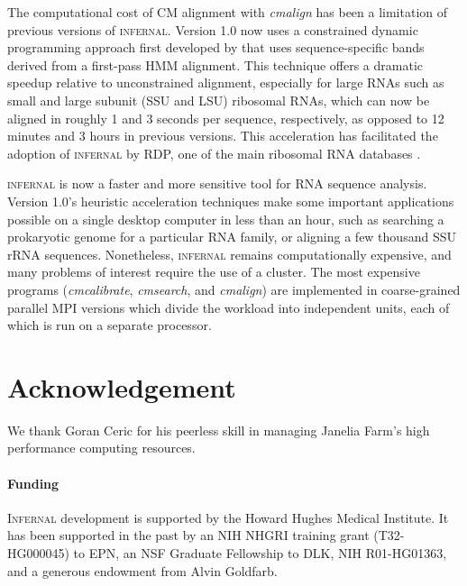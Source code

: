 \documentclass{bioinfo}
\begin{document}
\begin{application}
The computational cost of CM alignment with \emph{cmalign} has been a
limitation of previous versions of \textsc{infernal}. Version 1.0 now
uses a constrained dynamic programming approach first developed by
\citet{Brown00} that uses sequence-specific bands derived from a
first-pass HMM alignment. This technique offers a dramatic speedup
relative to unconstrained alignment, especially for large RNAs such as
small and large subunit (SSU and LSU) ribosomal RNAs, which can now be
aligned in roughly 1 and 3 seconds per sequence, respectively, as
opposed to 12 minutes and 3 hours in previous versions.  This
acceleration has facilitated the adoption of \textsc{infernal} by RDP,
one of the main ribosomal RNA databases \citep{Cole09}.

\textsc{infernal} is now a faster and more sensitive tool for RNA
sequence analysis.  Version 1.0's heuristic acceleration techniques
make some important applications possible on a single desktop computer
in less than an hour, such as searching a prokaryotic genome for a
particular RNA family, or aligning a few thousand SSU rRNA sequences.
Nonetheless, \textsc{infernal} remains computationally expensive, and many
problems of interest require the use of a cluster.  The most expensive
programs (\emph{cmcalibrate}, \emph{cmsearch}, and \emph{cmalign}) are
implemented in coarse-grained parallel MPI versions which divide the
workload into independent units, each of which is run on a separate
processor. 


\section*{Acknowledgement}

We thank Goran Ceric for his peerless skill in managing Janelia Farm's
high performance computing resources.

\paragraph*{Funding\textcolon} 
\textsc{Infernal} development is supported by the Howard Hughes
Medical Institute. It has been supported in the past by an NIH NHGRI
training grant (T32-HG000045) to EPN, an NSF Graduate Fellowship to
DLK, NIH R01-HG01363, and a generous endowment from Alvin Goldfarb.



\end{application}
\end{document}
